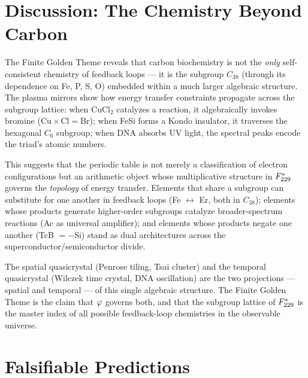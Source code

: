 \section{Discussion: The Chemistry Beyond Carbon}
\label{sec:discussion}

The Finite Golden Theme reveals that carbon biochemistry is not the \emph{only} self-consistent chemistry of feedback loops --- it is the subgroup $C_{38}$ (through its dependence on Fe, P, S, O) embedded within a much larger algebraic structure.  The plasma mirrors show how energy transfer constraints propagate across the subgroup lattice: when CuCl$_2$ catalyzes a reaction, it algebraically invokes bromine ($\mathrm{Cu} \times \mathrm{Cl} = \mathrm{Br}$); when FeSi forms a Kondo insulator, it traverses the hexagonal $C_6$ subgroup; when DNA absorbs UV light, the spectral peaks encode the triad's atomic numbers.

This suggests that the periodic table is not merely a classification of electron configurations but an arithmetic object whose multiplicative structure in $F_{229}^*$ governs the \emph{topology} of energy transfer.  Elements that share a subgroup can substitute for one another in feedback loops (Fe $\leftrightarrow$ Er, both in $C_{38}$); elements whose products generate higher-order subgroups catalyze broader-spectrum reactions (Ac as universal amplifier); and elements whose products negate one another (TcB $= -$Si) stand as dual architectures across the superconductor/semiconductor divide.

The spatial quasicrystal (Penrose tiling, Tsai cluster) and the temporal quasicrystal (Wilczek time crystal, DNA oscillation) are the two projections --- spatial and temporal --- of this single algebraic structure.  The Finite Golden Theme is the claim that $\varphi$ governs both, and that the subgroup lattice of $F_{229}^*$ is the master index of all possible feedback-loop chemistries in the observable universe.


\section{Falsifiable Predictions}
\label{sec:predictions}

